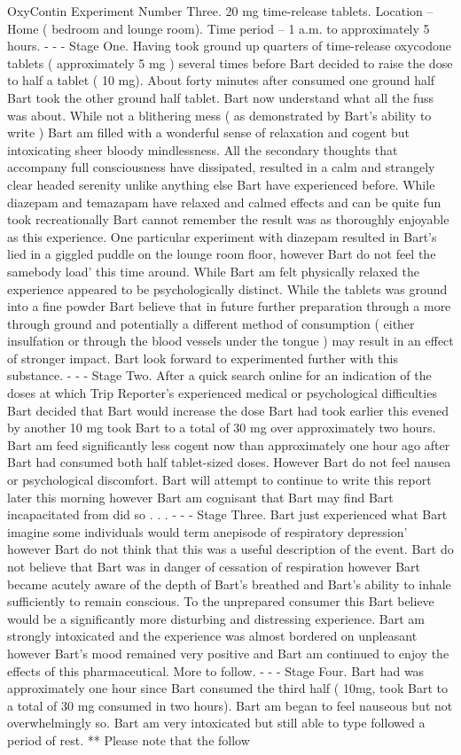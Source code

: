 \documentclass[12pt]{book}
\begin{document}
OxyContin Experiment Number Three. 20 mg time-release tablets. Location -- Home ( bedroom and lounge room). Time period -- 1 a.m. to approximately 5  hours. - - - Stage One. Having took ground up quarters of time-release oxycodone tablets ( approximately 5 mg ) several times before Bart decided to raise the dose to half a tablet ( 10 mg). About forty minutes after consumed one ground half Bart took the other ground half tablet. Bart now understand what all the fuss was about. While not a blithering mess ( as demonstrated by Bart's ability to write ) Bart am filled with a wonderful sense of relaxation and cogent but intoxicating sheer bloody mindlessness. All the secondary thoughts that accompany full consciousness have dissipated, resulted in a calm and strangely clear headed serenity unlike anything else Bart have experienced before. While diazepam and temazapam have relaxed and calmed effects and can be quite fun took recreationally Bart cannot remember the result was as thoroughly enjoyable as this experience. One particular experiment with diazepam resulted in Bart's lied in a giggled puddle on the lounge room floor, however Bart do not feel the samebody load' this time around. While Bart am felt physically relaxed the experience appeared to be psychologically distinct. While the tablets was ground into a fine powder Bart believe that in future further preparation through a more through ground and potentially a different method of consumption ( either insulfation or through the blood vessels under the tongue ) may result in an effect of stronger impact. Bart look forward to experimented further with this substance. - - - Stage Two. After a quick search online for an indication of the doses at which Trip Reporter's experienced medical or psychological difficulties Bart decided that Bart would increase the dose Bart had took earlier this evened by another 10 mg took Bart to a total of 30 mg over approximately two hours. Bart am feed significantly less cogent now than approximately one hour ago after Bart had consumed both half tablet-sized doses. However Bart do not feel nausea or psychological discomfort. Bart will attempt to continue to write this report later this morning however Bart am cognisant that Bart may find Bart incapacitated from did so . . .  - - - Stage Three. Bart just experienced what Bart imagine some individuals would term anepisode of respiratory depression' however Bart do not think that this was a useful description of the event. Bart do not believe that Bart was in danger of cessation of respiration however Bart became acutely aware of the depth of Bart's breathed and Bart's ability to inhale sufficiently to remain conscious. To the unprepared consumer this Bart believe would be a significantly more disturbing and distressing experience. Bart am strongly intoxicated and the experience was almost bordered on unpleasant however Bart's mood remained very positive and Bart am continued to enjoy the effects of this pharmaceutical. More to follow. - - - Stage Four. Bart had was approximately one hour since Bart consumed the third half ( 10mg, took Bart to a total of 30 mg consumed in two hours). Bart am began to feel nauseous but not overwhelmingly so. Bart am very intoxicated but still able to type followed a period of rest. ** Please note that the follow 
\end{document}

